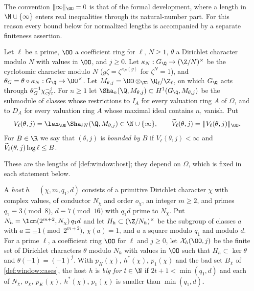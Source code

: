 The convention $\|\infty\|_\OO=0$ is that of the formal development, where a length in $\N\cup\{\infty\}$ enters
real inequalities through its natural-number part. For this reason every bound below for normalized lengths is
accompanied by a separate finiteness assertion.

\begin{definition}\label{pf:vwin-he:V}
Let $\ell$ be a prime, $\OO$ a coefficient ring for $\ell$, $N\ge1$, $\theta$ a Dirichlet character modulo $N$
with values in $\OO$, and $j\ge0$. Let $\kappa_N:G_\Q\to(\Z/N)^\times$ be the cyclotomic character modulo $N$
($g\zeta=\zeta^{\kappa_N(g)}$ for $\zeta^N=1$), and $\theta_G=\theta\circ\kappa_N:G_\Q\to\OO^\times$. Let
$M_{\theta,j}=\OO\otimes_{\Zl}\vwinheQZ$, on which $G_\Q$ acts through $\theta_G^{-1}\chi_{\mathrm{cyc}}^{-j}$. For $n\ge1$
let $\Sha_n(\Q,M_{\theta,j})\subset H^1(G_\Q,M_{\theta,j})$ be the submodule of classes whose restrictions to
$I_A$ for every valuation ring $A$ of $\Omega$, and to $D_A$ for every valuation ring $A$ whose maximal ideal
contains $n$, vanish. Put
\[
 V_\ell(\theta,j)=\len_\OO\Sha_{\ell N}(\Q,M_{\theta,j})\in\N\cup\{\infty\},\qquad
 \vwinheVt_\ell(\theta,j)=\|V_\ell(\theta,j)\|_\OO .
\]
For $B\in\R$ we say that $(\theta,j)$ is \emph{bounded by $B$} if $V_\ell(\theta,j)<\infty$ and
$\widetilde V_\ell(\theta,j)\log\ell\le B$.
\end{definition}

These are the lengths of \cref{def:window:host}; they depend on $\Omega$, which is fixed in each statement below.

\begin{definition}[Hosts]\label{pf:vwin-he:host}
A \emph{host} $h=(\chi,m,q_1,d)$ consists of a primitive Dirichlet character $\chi$ with complex values, of
conductor $N_\chi$ and order $o_\chi$, an integer $m\ge2$, and primes $q_1\equiv3\pmod8$, $d\equiv7\pmod{16}$ with
$q_1d$ prime to $N_\chi$. Put $N_h=\lcm(2^{m+2},N_\chi)\,q_1d$ and let $H_h\subset(\Z/N_h)^\times$ be the
subgroup of classes $a$ with $a\equiv\pm1\pmod{2^{m+2}}$, $\chi(a)=1$, and $a$ a square modulo $q_1$ and modulo
$d$. For a prime $\ell$, a coefficient ring $\OO$ for $\ell$ and $j\ge0$, let $\vwinheX_h(\OO,j)$ be the finite
set of Dirichlet characters $\theta$ modulo $N_h$ with values in $\OO$ such that $H_h\subset\ker\theta$ and
$\theta(-1)=(-1)^j$. With $p_K(\chi)$, $h^*(\chi)$, $p_1(\chi)$ and the bad set $B_\chi$ of
\cref{def:window:cases}, the host $h$ is \emph{big for} $t\in\N$ if $2t+1<\min(q_1,d)$ and each of $N_\chi$,
$o_\chi$, $p_K(\chi)$, $h^*(\chi)$, $p_1(\chi)$ is smaller than $\min(q_1,d)$.
\end{definition}

